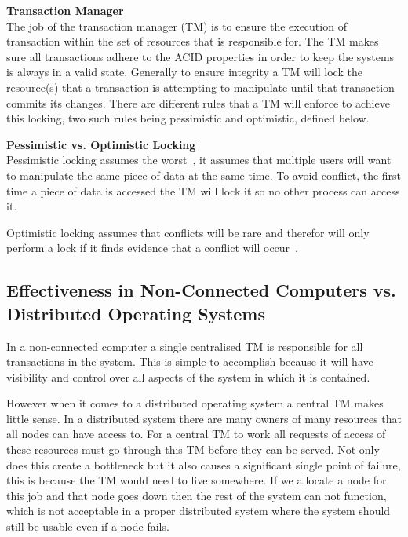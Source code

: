 \documentclass[a4paper,12pt]{article}
\begin{document}
\par\textbf{Transaction Manager}\\
The job of the transaction manager (TM) is to ensure the execution of transaction within the set of resources that is responsible for.
The TM makes sure all transactions adhere to the ACID properties in order to keep the systems is always in a valid state.
Generally to ensure integrity a TM will lock the resource(s) that a transaction is attempting to manipulate until that transaction commits its changes.
There are different rules that a TM will enforce to achieve this locking, two such rules being pessimistic and optimistic, defined below.

\par\textbf{Pessimistic vs. Optimistic Locking}\\
Pessimistic locking assumes the worst~\citep{pessimistic-vs-optimistic}, it assumes that multiple users will want to manipulate the same piece of data at the same time. To avoid conflict, the first time a piece of data is accessed the TM will lock it so no other process can access it.

Optimistic locking assumes that conflicts will be rare and therefor will only perform a lock if it finds evidence that a conflict will occur~\citep{pessimistic-vs-optimistic}.



\subsection*{Effectiveness in Non-Connected  Computers vs. Distributed Operating Systems}
In a non-connected computer a single centralised TM is responsible for all transactions in the system. 
This is simple to accomplish because it will have visibility and control over all aspects of the system in which it is contained. 

However when it comes to a distributed operating system a central TM makes little sense. 
In a distributed system there are many owners of many resources that all nodes can have access to.
For a central TM to work all requests of access of these resources must go through this TM before they can be served.
Not only does this create a bottleneck but it also causes a significant single point of failure, this is because the TM would need to live somewhere. 
If we allocate a node for this job and that node goes down then the rest of the system can not function, which is not acceptable in a proper distributed system where the system should still be usable even if a node fails.
\end{document}
